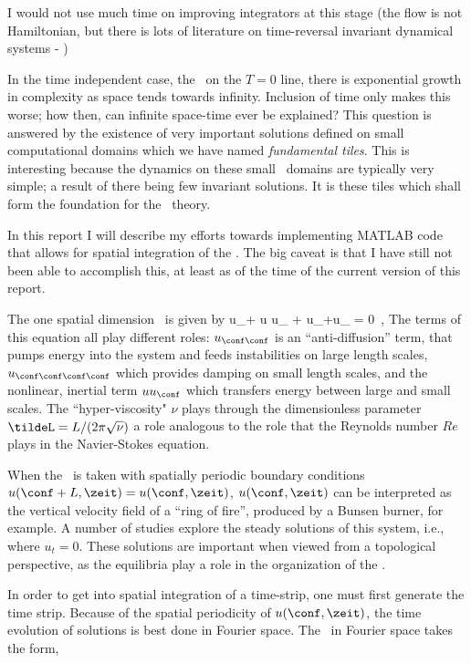 
I would not use much time on improving integrators at this stage (the
flow is not Hamiltonian, but there is lots of literature on time-reversal
invariant dynamical systems - )


In the time independent case, the \KSe\ on the $T=0$ line,
there is exponential growth in complexity
as space tends towards infinity. Inclusion of time
only makes this worse; how then, can infinite space-time ever
be explained? This question is answered by the existence
of very important solutions defined on small computational domains
which we have named \textit{fundamental tiles}. This is interesting
because the dynamics on these small \spt\ domains are typically
very simple; a result of there being few invariant solutions.
It is these tiles which shall form the foundation for the
\spt\ theory.


In this report I will describe my efforts towards implementing MATLAB
code that allows for spatial integration of the \KSe. The big caveat is
that I have still not been able to accomplish this, at least as of the
time of the current version of this report.


The one spatial dimension \KSe\ is given by
\beq
    u_\zeit + u u_\conf
    + u_{\conf \conf}+\nu u_{\conf \conf \conf \conf} = 0 \,,
    \label{e-MNGre1}
\eeq
The terms of this equation all play different roles: $u_{\conf \conf}$
is an ``anti-diffusion'' term, that pumps energy into the system and
feeds instabilities on large length scales,
$u_{\conf \conf \conf \conf}$ which provides damping on small  length scales, and
the nonlinear, inertial term $u u_\conf$ which transfers energy between
large and small scales. The ``hyper-viscosity" $\nu$ plays through
the dimensionless parameter $\tildeL = L/(2\pi \sqrt{\nu})$ a role analogous
to the role that the Reynolds number $Re$ plays in the Navier-Stokes equation.

When the \KSe\ is taken with spatially periodic boundary conditions
$u(\conf + L, \zeit) = u(\conf, \zeit)$,  $u(\conf, \zeit)$
can be interpreted as  the vertical velocity
field of a ``ring of fire'', produced by a Bunsen burner, for example. A
number of studies
explore the steady solutions of this system, i.e., where $u_t = 0$.
These solutions are important when viewed from a topological perspective,
as the equilibria play a role in the organization of the \statesp.


In order to get into spatial integration of a time-strip, one must first generate the time strip. Because of the spatial periodicity of $u(\conf, \zeit)$, the time evolution of solutions is best done in Fourier space. The \KSe\ in Fourier space takes the form,

